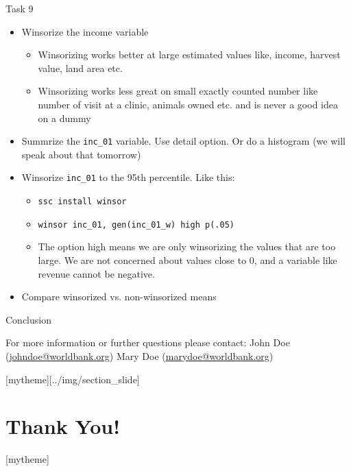 \documentclass[aspectratio=169]{beamer}
\newcommand{\sectionpic}[2]{
	\setbeamertemplate{section page}[mytheme][#2]
	\section{#1}
	\setbeamertemplate{section page}[mytheme]
}
\begin{document}
\begin{frame}{Task 9}
	\begin{itemize}
		\item Winsorize the income variable
		\begin{itemize}
			\item Winsorizing works better at large estimated values like, income, harvest value, land area etc.
			\item Winsorizing works less great on small exactly counted number like number of visit at a clinic, animals owned etc. and is never a good idea on a dummy
		\end{itemize}
		\item Summrize the \texttt{inc\_01} variable. Use detail option. Or do a histogram (we will speak about that tomorrow)
		\item Winsorize \texttt{inc\_01} to the 95th percentile. Like this:
			\begin{itemize}
				\item \texttt{ssc install winsor}
				\item \texttt{winsor inc\_01, gen(inc\_01\_w) high p(.05)}
				\item The option high means we are only winsorizing the values that are too large. We are not concerned about values close to 0, and a variable like revenue cannot be negative.
			\end{itemize}
		\item Compare winsorized vs. non-winsorized means
	\end{itemize}
\end{frame}
	
\begin{frame}{Conclusion}


\vspace{20mm}
For more information or further questions please contact:
\newline John Doe (\url{johndoe@worldbank.org}) \newline Mary Doe (\url{marydoe@worldbank.org})

\end{frame}

\sectionpic{Thank You!}{../img/section_slide}
\end{document}

